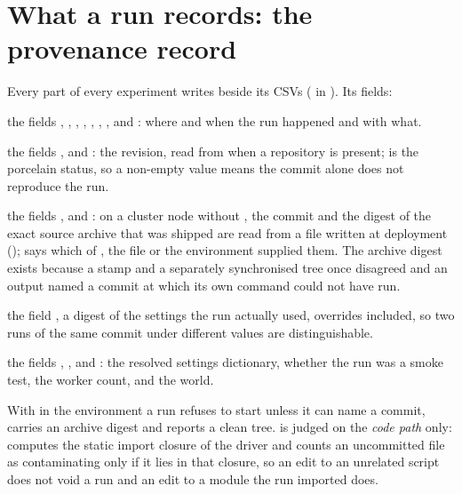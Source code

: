 \section{What a run records: the provenance record}
\label{sec:provenance}

Every part of every experiment writes  beside its CSVs
( in ). Its fields:
\begin{description}[leftmargin=2em,itemsep=0.2em]
\item[machine] the fields , , ,
  , , , ,
   and : where and when the run happened
  and with what.
\item[revision] the fields ,  and :
  the revision, read from  when a repository is present;  is
  the porcelain status, so a non-empty value means the commit alone does not reproduce
  the run.
\item[archive] the fields ,  and
  :
  on a cluster node without , the commit and the digest of the exact source
  archive that was shipped are read from a  file written at deployment
  ();  says which of , the file or the
  environment supplied them. The archive digest exists because a stamp and a separately
  synchronised tree once disagreed and an output named a commit at which its own command
  could not have run.
\item[configuration] the field , a digest of the settings the run actually used,
  overrides included, so two runs of the same commit under different  values
  are distinguishable.
\item[settings] the fields , ,  and
  : the resolved settings dictionary, whether the run was a smoke test, the
  worker count, and the world.
\end{description}
With  in the environment a run refuses to start unless it can
name a commit, carries an archive digest and reports a clean tree.  is
judged on the \emph{code path} only:  computes the static
import closure of the driver and counts an uncommitted file as contaminating only if it
lies in that closure, so an edit to an unrelated script does not void a run and an edit
to a module the run imported does.

